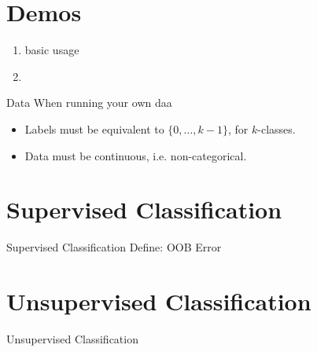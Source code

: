 \documentclass[xcolor=dvipsnames]{beamer}
\begin{document}
\section{Demos}

\begin{frame}{}
    \begin{enumerate}
        \item basic usage
        \item 
    \end{enumerate}
\end{frame}

\begin{frame}{Data}
    When running your own daa
    \begin{itemize}
        \item Labels must be equivalent to $\{0, \dots, k-1\}$, for $k$-classes.
        \item Data must be continuous, i.e. non-categorical.
    \end{itemize}
\end{frame}


\section{Supervised Classification}
\begin{frame}{Supervised Classification}
Define: OOB Error
\end{frame}



\section{Unsupervised Classification}
\begin{frame}{Unsupervised Classification}

\end{frame}
\end{document}
